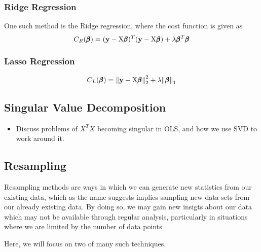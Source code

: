 \documentclass[reprint, english, nofootinbib]{revtex4-2}
\begin{document}
        \subsubsection{Ridge Regression}
            One such method is the Ridge regression, where the cost function is given as
            \begin{equation}
                C_{R}(\pmb \beta)
                = (\mathbf y - \textup{X}\pmb\beta)^T(\mathbf y - \textup{X}\pmb\beta)
                + \lambda \pmb\beta^T\pmb\beta
            \end{equation}
        \subsubsection{Lasso Regression}
            \begin{equation}
                C_L(\pmb \beta) =
                \norm{\mathbf y - \textup{X}\pmb{\beta}}_2^2
                + \lambda\norm{\pmb{\beta}}_1
            \end{equation}
    \subsection{Singular Value Decomposition}
        \begin{itemize}
            \item Discuss problems of $X^T X$ becoming singular in OLS, and how we use SVD to work around it.
        \end{itemize}

    \subsection{Resampling}
        \noindent
        Resampling methods are ways in which we can generate new statistics from our existing data, which as the name suggests implies sampling new data sets from our already existing data. By doing so, we may gain new insigts about our data which may not be available through regular analysis, particularly in situations where we are limited by the number of data points.

        Here, we will focus on two of many such techniques.
\end{document}
